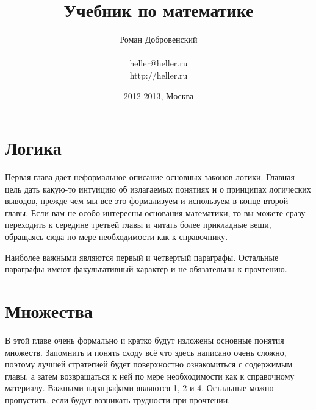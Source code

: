 \documentclass[a5paper,10pt,pagesize,DIV=classic]{scrbook}
\begin{document}
\title{Учебник по математике}
\author{Роман Добровенский\\ \\heller@heller.ru\\http://heller.ru}
\date{2012-2013, Москва}
\maketitle

\tableofcontents



\chapter{Логика}
Первая глава дает неформальное описание основных законов логики. Главная цель дать какую-то интуицию об излагаемых понятиях и о принципах логических выводов, прежде чем мы все это формализуем и используем в конце второй главы. Если вам не особо интересны основания математики, то вы можете сразу переходить к середине третьей главы и читать более прикладные вещи, обращаясь сюда по мере необходимости как к справочнику.

Наиболее важными являются первый и четвертый параграфы. Остальные параграфы имеют факультативный характер и не обязательны к прочтению.











\chapter{Множества}
В этой главе очень формально и кратко будут изложены основные понятия множеств. Запомнить и понять сходу всё что здесь написано очень сложно, поэтому лучшей стратегией будет поверхностно ознакомиться с содержимым главы, а затем возвращаться к ней по мере необходимости как к справочному материалу. Важными параграфами являются 1, 2 и 4. Остальные можно пропустить, если будут возникать трудности при прочтении.








\end{document}
